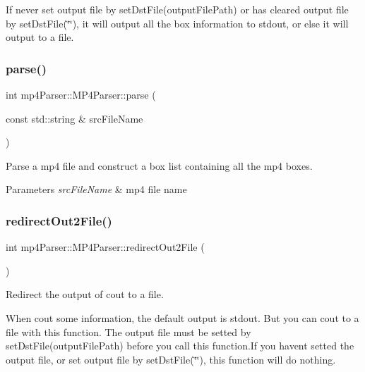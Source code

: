 If never set output file by set\+Dst\+File(output\+File\+Path) or has cleared output file by set\+Dst\+File(\char`\"{}\char`\"{}), it will output all the box information to stdout, or else it will output to a file. \mbox{\label{classmp4_parser_1_1_m_p4_parser_ab91eea9d61232b6db52eda81c65e8ad4}} 
\subsubsection{\texorpdfstring{parse()}{parse()}}
{\footnotesize\ttfamily int mp4\+Parser\+::\+M\+P4\+Parser\+::parse (\begin{DoxyParamCaption}\item[{const std\+::string \&}]{src\+File\+Name }\end{DoxyParamCaption})}



Parse a mp4 file and construct a box list containing all the mp4 boxes. 


\begin{DoxyParams}{Parameters}
{\em src\+File\+Name} & mp4 file name \\
\hline
\end{DoxyParams}
\mbox{\label{classmp4_parser_1_1_m_p4_parser_a29f0fc9e2e0c7ed4751e44b8f28092c3}} 
\subsubsection{\texorpdfstring{redirectOut2File()}{redirectOut2File()}}
{\footnotesize\ttfamily int mp4\+Parser\+::\+M\+P4\+Parser\+::redirect\+Out2\+File (\begin{DoxyParamCaption}{ }\end{DoxyParamCaption})}



Redirect the output of cout to a file. 

When cout some information, the default output is stdout. But you can cout to a file with this function. The output file must be setted by set\+Dst\+File(output\+File\+Path) before you call this function.\+If you haven\textquotesingle{}t setted the output file, or set output file by set\+Dst\+File(\char`\"{}\char`\"{}), this function will do nothing. \mbox{\label{classmp4_parser_1_1_m_p4_parser_a7270d8138d1e9c6db3ed4838e5f34ee6}} 
